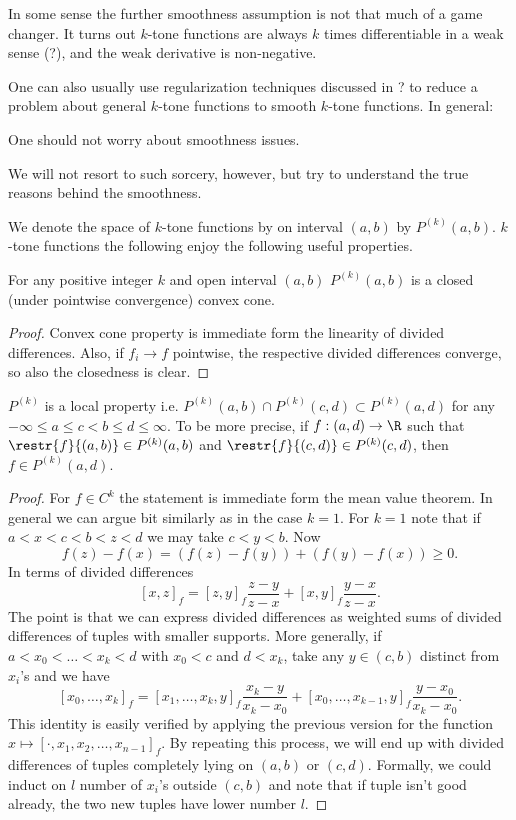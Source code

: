 In some sense the further smoothness assumption is not that much of a game changer. It turns out $k$-tone functions are always $k$ times differentiable in a weak sense (?), and the weak derivative is non-negative.

One can also usually use regularization techniques discussed in ? to reduce a problem about general $k$-tone functions to smooth $k$-tone functions. In general:

\begin{phil}
	One should not worry about smoothness issues.
\end{phil}

We will not resort to such sorcery, however, but try to understand the true reasons behind the smoothness.

We denote the space of $k$-tone functions by on interval $(a, b)$ by $P^{(k)}(a, b)$. $k$-tone functions the following enjoy the following useful properties.

\begin{prop}
	For any positive integer $k$ and open interval $(a, b)$ $P^{(k)}(a, b)$ is a closed (under pointwise convergence) convex cone.
\end{prop}
\begin{proof}
	Convex cone property is immediate form the linearity of divided differences. Also, if $f_{i} \to f$ pointwise, the respective divided differences converge, so also the closedness is clear.
\end{proof}

\begin{prop}
	$P^{(k)}$ is a local property i.e. $P^{(k)}(a, b) \cap P^{(k)}(c, d) \subset P^{(k)}(a, d)$ for any $-\infty \leq a \leq c < b \leq d \leq \infty$. To be more precise, if $f : (a, d) \to \R$ such that $\restr{f}{(a, b)} \in P^{(k)}(a, b)$ and $\restr{f}{(c, d)} \in P^{(k)}(c, d)$, then $f \in P^{(k)}(a, d)$.
\end{prop}
\begin{proof}
	For $f \in C^{k}$ the statement is immediate form the mean value theorem. In general we can argue bit similarly as in the case $k = 1$. For $k = 1$ note that if $a < x < c < b < z < d$ we may take $c < y < b$. Now
	\[
		f(z) - f(x) = (f(z) - f(y)) + (f(y) - f(x)) \geq 0.
	\]
	In terms of divided differences
	\[
		[x, z]_{f} = [z, y]_{f} \frac{z - y}{z - x} + [x, y]_{f} \frac{y - x}{z - x}.
	\]
	The point is that we can express divided differences as weighted sums of divided differences of tuples with smaller supports. More generally, if $a < x_{0} < \ldots < x_{k} < d$ with $x_{0} < c$ and $d < x_{k}$, take any $y \in (c, b)$ distinct from $x_{i}$'s and we have
	\[
		[x_{0}, \ldots, x_{k}]_{f} = [x_{1}, \ldots, x_{k}, y]_{f} \frac{x_{k} - y}{x_{k} - x_{0}} + [x_{0}, \ldots, x_{k - 1}, y]_{f} \frac{y - x_{0}}{x_{k} - x_{0}}.
	\]
	This identity is easily verified by applying the previous version for the function $x \mapsto [\cdot, x_{1}, x_{2}, \ldots, x_{n - 1}]_{f}$. By repeating this process, we will end up with divided differences of tuples completely lying on $(a, b)$ or $(c, d)$. Formally, we could induct on $l$ number of $x_{i}$'s outside $(c, b)$ and note that if tuple isn't good already, the two new tuples have lower number $l$.
\end{proof}

